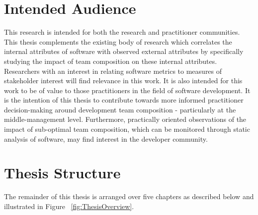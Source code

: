 \section{Intended Audience} %
This research is intended for both the research and practitioner communities. This thesis complements the existing body of research which correlates the internal attributes of software with observed external attributes by specifically studying the impact of team composition on these internal attributes. Researchers with an interest in relating software metrics to measures of stakeholder interest will find relevance in this work. It is also intended for this work to be of value to those practitioners in the field of software development. It is the intention of this thesis to contribute towards more informed practitioner decision-making around development team composition - particularly at the middle-management level. Furthermore, practically oriented observations of the impact of sub-optimal team composition, which can be monitored through static analysis of software, may find interest in the developer community.

\section{Thesis Structure} %
The remainder of this thesis is arranged over five chapters as described below and illustrated in Figure ~\ref{fig:ThesisOverview}.

